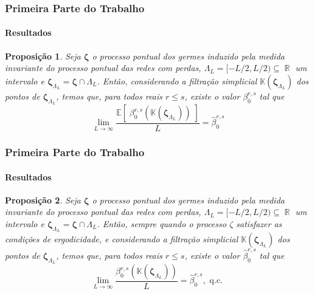 \documentclass[11pt]{beamer}
\DeclareMathOperator{\R}{\mathbb{R}}
\theoremstyle{remark}
\theoremstyle{definition}
\theoremstyle{plain}
\newtheorem{proposicao}{Proposição}
\begin{document}
    \begin{frame}
        \frametitle{Primeira Parte do Trabalho}
        \framesubtitle{Resultados}

        \begin{proposicao}\label{prop:primeira_conv}
          Seja $\bm{\zeta}$ o processo pontual dos germes induzido
          pela medida invariante do processo pontual das redes
          com perdas, $\Lambda_{L} = [-L/2, L/2) \subseteq \R$ um
          intervalo e $\bm{\zeta}_{\Lambda_{L}} = \bm{\zeta} \cap
          \Lambda_{L}$. Então, considerando a filtração simplicial
          $\mathbb{K}( \bm{\zeta}_{\Lambda_{L}} )$ dos pontos de
          $\bm{\zeta}_{\Lambda_{L}}$, temos que, para todos reais $r
          \leq s$, existe o valor $\beta_{0}^{r,s}$ tal que
          \[
            \lim_{L \to \infty}
            \frac {
                \mathbb{E}[\;
                        \beta_{0}^{r,s} (\mathbb{K}(\bm{\zeta}_{\Lambda_{L}}))
                \;]
            }
            {L}
            =  \hat{\beta}_{0}^{r,s}
          \]
        \end{proposicao}
    \end{frame}

    \begin{frame}
        \frametitle{Primeira Parte do Trabalho}
        \framesubtitle{Resultados}

        \begin{proposicao}\label{prop:conv_quase_certa}
          Seja $\bm{\zeta}$ o processo pontual dos germes induzido
          pela medida invariante do processo pontual das redes com
          perdas, $\Lambda_{L} = [-L/2, L/2) \subseteq \R$ um intervalo
          e $\bm{\zeta}_{\Lambda_{L}} = \bm{\zeta} \cap \Lambda_{L}$.
          Então, sempre quando o processo $\zeta$ satisfazer as
          condições de ergodicidade, e considerando a filtração
          simplicial $\mathbb{K}( \bm{\zeta}_{\Lambda_{L}} )$ dos pontos
          de $\bm{\zeta}_{\Lambda_{L}}$, temos que, para todos reais $r
          \leq s$, existe o valor $\hat{ \beta }_{0}^{r,s}$ tal que
          \[
            \lim_{L \to \infty}
            \frac{ 
                \beta_{0}^{r,s} (\mathbb{K}(\bm{\zeta}_{\Lambda_{L}}))
            }{L}
            =
            \hat {\beta}_{0}^{r,s}, \text{ q.c. }
          \]
        \end{proposicao}
    \end{frame}
\end{document}
